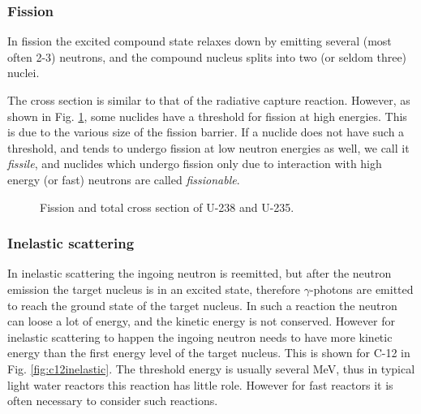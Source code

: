 \subsubsection*{Fission}

In fission the excited compound state relaxes down by emitting several (most often 2-3) neutrons, and the compound nucleus splits into two (or seldom three) nuclei. 

The cross section is similar to that of the radiative capture reaction. However, as shown in Fig. \ref{fig:ufission}, some nuclides have a threshold for fission at high energies. This is due to the various size of the fission barrier. If a nuclide does not have such a threshold, and tends to undergo fission at low neutron energies as well, we call it \textit{fissile}, and nuclides which undergo fission only due to interaction with high energy (or fast) neutrons are called \textit{fissionable}.

\begin{figure}[ht!]
\protect {}\protect
\caption{\label{fig:ufission} \footnotesize{Fission and total cross section of U-238 and U-235.}}
\end{figure}

\subsubsection*{Inelastic scattering}

In inelastic scattering the ingoing neutron is reemitted, but after the neutron emission the target nucleus is in an excited state, therefore $\gamma$-photons are emitted to reach the ground state of the target nucleus. In such a reaction the neutron can loose a lot of energy, and the kinetic energy is not conserved. However for inelastic scattering to happen the ingoing neutron needs to have more kinetic energy than the first energy level of the target nucleus. This is shown for C-12 in Fig. \ref{fig:c12inelastic}. The threshold energy is usually several MeV, thus in typical light water reactors this reaction has little role. However for fast reactors it is often necessary to consider such reactions.

